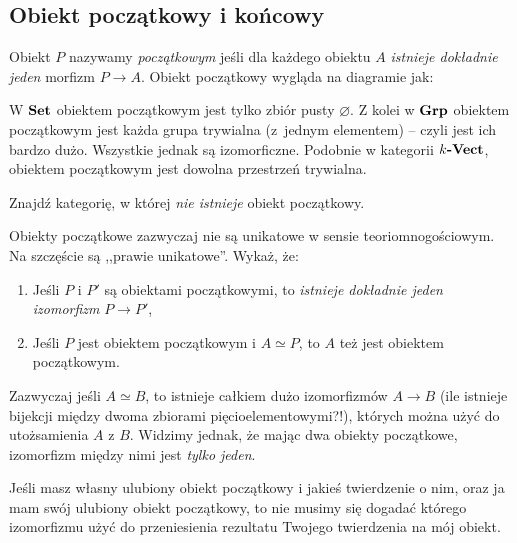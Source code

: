 \subsection{Obiekt początkowy i końcowy}
\begin{defn}
  Obiekt $P$ nazywamy \emph{początkowym} jeśli dla każdego obiektu $A$ \emph{istnieje dokładnie jeden} morfizm $P\to A$. Obiekt początkowy wygląda na diagramie jak:
        \begin{center} \end{center}
\end{defn}

\begin{exmp}
  W $\textbf{Set}$ obiektem początkowym jest tylko zbiór pusty $\varnothing$. Z kolei w $\textbf{Grp}$ obiektem początkowym jest każda grupa trywialna (z~jednym elementem) -- czyli jest ich bardzo dużo. Wszystkie jednak są izomorficzne. Podobnie w kategorii $k\textbf{-Vect}$, obiektem początkowym jest dowolna przestrzeń trywialna.
\end{exmp}

\begin{exc}
	Znajdź kategorię, w której \emph{nie istnieje} obiekt początkowy.
\end{exc}

\begin{exc}
	Obiekty początkowe zazwyczaj nie są unikatowe w sensie teoriomnogościowym. Na szczęście są ,,prawie unikatowe''. Wykaż, że:
	\begin{enumerate}
		\item Jeśli $P$ i $P'$ są obiektami początkowymi, to \emph{istnieje dokładnie jeden izomorfizm} $P\to P'$,
		\item Jeśli $P$ jest obiektem początkowym i $A\simeq P$, to $A$ też jest obiektem początkowym.
	\end{enumerate}
\end{exc}

\begin{remk}
	Zazwyczaj jeśli $A\simeq B$, to istnieje całkiem dużo izomorfizmów $A\to B$ (ile istnieje bijekcji między dwoma zbiorami pięcioelementowymi?!), których można użyć do utożsamienia $A$ z $B$. Widzimy jednak, że mając dwa obiekty początkowe, izomorfizm między nimi jest \emph{tylko jeden}.

  Jeśli masz własny ulubiony obiekt początkowy i jakieś twierdzenie o nim, oraz ja mam swój ulubiony obiekt początkowy, to nie musimy się dogadać którego izomorfizmu użyć do przeniesienia rezultatu Twojego twierdzenia na mój obiekt.
\end{remk}

